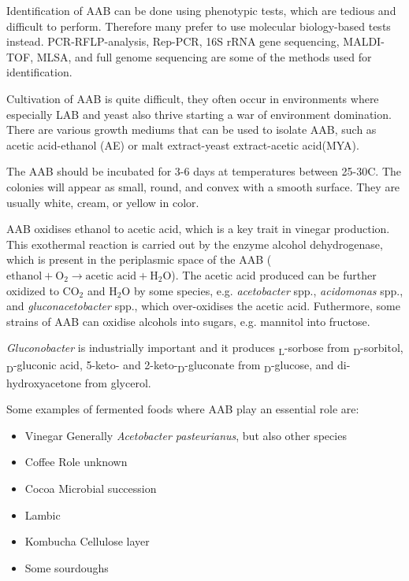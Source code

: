 Identification of AAB can be done using phenotypic tests, which are tedious and difficult to perform. Therefore many prefer to use molecular biology-based tests instead. PCR-RFLP-analysis, Rep-PCR, 16S rRNA gene sequencing, MALDI-TOF, MLSA, and full genome sequencing are some of the methods used for identification.

Cultivation of AAB is quite difficult, they often occur in environments where especially LAB and yeast also thrive starting a war of environment domination. There are various growth mediums that can be used to isolate AAB, such as  acetic acid-ethanol (AE) or malt extract-yeast extract-acetic acid(MYA).

The AAB should be incubated for 3-6 days at temperatures between 25-30\textdegree C. The colonies will appear as small, round, and convex with a smooth surface. They are usually white, cream, or yellow in color.

AAB oxidises ethanol to acetic acid, which is a key trait in vinegar production. This exothermal reaction is carried out by the enzyme alcohol dehydrogenase, which is present in the periplasmic space of the AAB ($\text{ethanol} + \text{O}_2 \rightarrow \text{acetic acid} + \text{H}_2\text{O}$). The acetic acid produced can be further oxidized to $\text{CO}_2$ and $\text{H}_2\text{O}$ by some species, e.g. \textit{acetobacter} spp., \textit{acidomonas} spp., and \textit{gluconacetobacter} spp., which over-oxidises the acetic acid.
Futhermore, some strains of AAB can oxidise alcohols into sugars, e.g. mannitol into fructose. 

\textit{Gluconobacter} is industrially important and it produces \textsubscript{L}-sorbose from \textsubscript{D}-sorbitol, \textsubscript{D}-gluconic acid, 5-keto- and 2-keto-\textsubscript{D}-gluconate from \textsubscript{D}-glucose, and di-hydroxyacetone from glycerol.

Some examples of fermented foods where AAB play an essential role are:
\begin{itemize}
    \item Vinegar
    \subitem Generally \textit{Acetobacter pasteurianus}, but also other species
    \item Coffee
    \subitem Role unknown
    \item Cocoa
    \subitem Microbial succession
    \item Lambic
    \item Kombucha
    \subitem Cellulose layer
    \item Some sourdoughs
\end{itemize}




